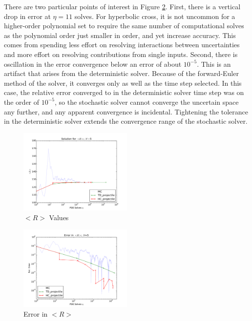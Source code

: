 \documentclass[11pt]{article}
\begin{document}
There are two particular points of interest in Figure \ref{prj errs}.  First, there is a vertical drop in error at $\eta=11$ solves.  For hyperbolic cross, it is not uncommon for a higher-order polynomial set to require the same number of computational solves as the polynomial order just smaller in order, and yet increase accuracy.  This comes from spending less effort on resolving interactions between uncertainties and more effort on resolving contributions from single inputs.  Second, there is oscillation in the error convergence below an error of about $10^{-5}$.  This is an artifact that arises from the deterministic solver.  Because of the forward-Euler method of the solver, it converges only as well as the time step selected.  In this case, the relative error converged to in the deterministic solver time step was on the order of $10^{-5}$, so the stochastic solver cannot converge the uncertain space any further, and any apparent convergence is incidental.  Tightening the tolerance in the deterministic solver extends the convergence range of the stochastic solver.
\begin{figure}[H]
    \centering
      \includegraphics[width=0.5\textwidth]{../graphics/projectile_solns}
      \caption{$<R>$ Values}
      \label{prj vals}
\end{figure}
\begin{figure}[H]
\centering
      \includegraphics[width=0.5\textwidth]{../graphics/projectile_errs}
      \caption{Error in $<R>$}
      \label{prj errs}
  \end{figure}
\end{document}
